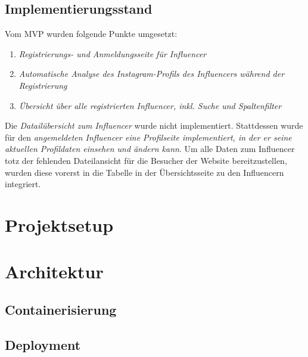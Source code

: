 \documentclass[conference,a4paper,flushend]{cs-techrep}
\begin{document}
\subsection{Implementierungsstand}
Vom MVP wurden folgende Punkte umgesetzt:
\begin{enumerate}
\item{\textit{Registrierungs- und Anmeldungsseite für Influencer}}
\item{\textit{Automatische Analyse des Instagram-Profils des Influencers während der Registrierung}}
\item{\textit{Übersicht über alle registrierten Influencer, inkl. Suche und Spaltenfilter}}
\end{enumerate}

Die \textit{Datailübersicht zum Influencer} wurde nicht implementiert. Stattdessen wurde für den \textit{angemeldeten Influencer eine Profilseite implementiert, in der er seine aktuellen Profildaten einsehen und ändern kann}. Um alle Daten zum Influencer totz der fehlenden Dateilansicht für die Besucher der Website bereitzustellen, wurden diese vorerst in die Tabelle in der Übersichtsseite zu den Influencern integriert. \\



\section{Projektsetup}



\section{Architektur}

\subsection{Containerisierung}

\subsection{Deployment}
\end{document}
